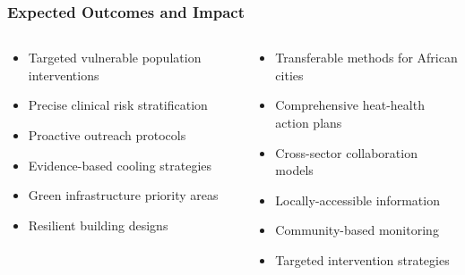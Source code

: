 \documentclass[aspectratio=169]{beamer}
\begin{document}
\begin{frame}
    \frametitle{Expected Outcomes and Impact}
    
    \begin{columns}[T]
        \begin{column}{0.48\textwidth}
            \begin{infobox}
                \begin{itemize}[leftmargin=*, itemsep=6pt]
                    \item Targeted vulnerable population interventions
                    \item Precise clinical risk stratification
                    \item Proactive outreach protocols
                \end{itemize}
            \end{infobox}
            
            \begin{infobox}
                \begin{itemize}[leftmargin=*, itemsep=6pt]
                    \item Evidence-based cooling strategies
                    \item Green infrastructure priority areas
                    \item Resilient building designs
                \end{itemize}
            \end{infobox}
        \end{column}
        \begin{column}{0.48\textwidth}
            \begin{infobox}
                \begin{itemize}[leftmargin=*, itemsep=6pt]
                    \item Transferable methods for African cities
                    \item Comprehensive heat-health action plans
                    \item Cross-sector collaboration models
                \end{itemize}
            \end{infobox}
            
            \begin{infobox}
                \begin{itemize}[leftmargin=*, itemsep=6pt]
                    \item Locally-accessible information
                    \item Community-based monitoring
                    \item Targeted intervention strategies
                \end{itemize}
            \end{infobox}
        \end{column}
    \end{columns}
\end{frame}
\end{document}
